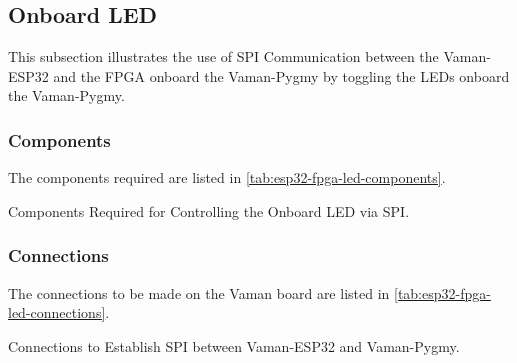 \subsection{Onboard LED}
This subsection illustrates the use of SPI Communication between the Vaman-ESP32
and the FPGA onboard the Vaman-Pygmy by toggling the LEDs onboard the
Vaman-Pygmy.

\subsubsection{Components}
The components required are listed in \autoref{tab:esp32-fpga-led-components}.
\begin{table}[!ht]
    \centering
    
    \caption{Components Required for Controlling the Onboard LED via SPI.}
    \label{tab:esp32-fpga-led-components}
\end{table}

\subsubsection{Connections}
The connections to be made on the Vaman board are listed in
\autoref{tab:esp32-fpga-led-connections}.
\begin{table}[!ht]
    \centering
    
    \caption{Connections to Establish SPI between Vaman-ESP32 and Vaman-Pygmy.}
    \label{tab:esp32-fpga-led-connections}
\end{table}

